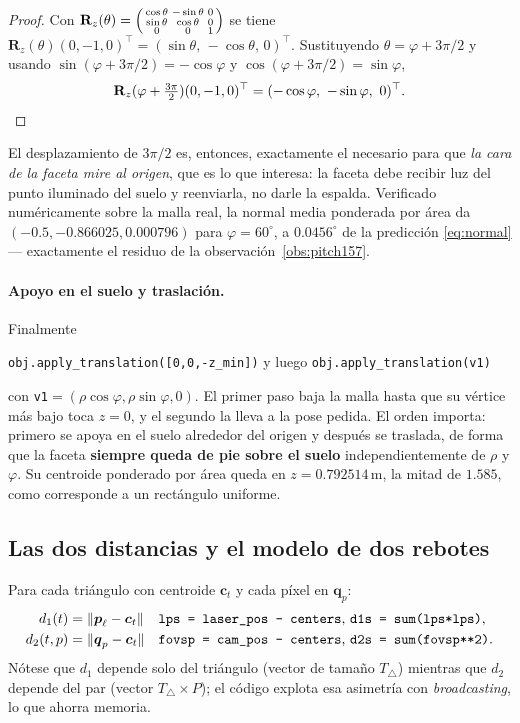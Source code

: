 \documentclass[11pt,a4paper]{article}
\newcommand{\vect}[1]{\boldsymbol{#1}}
\newcommand{\matr}[1]{\mathbf{#1}}
\newcommand{\code}[1]{\texttt{#1}}
\theoremstyle{definition}
\theoremstyle{plain}
\begin{document}
\begin{proof}
Con $\matr R_z(\theta)=\begin{psmallmatrix}\cos\theta&-\sin\theta&0\\
\sin\theta&\cos\theta&0\\0&0&1\end{psmallmatrix}$ se tiene
$\matr R_z(\theta)(0,-1,0)^\top=(\sin\theta,\,-\cos\theta,\,0)^\top$.
Sustituyendo $\theta=\varphi+3\pi/2$ y usando
$\sin(\varphi+3\pi/2)=-\cos\varphi$ y $\cos(\varphi+3\pi/2)=\sin\varphi$,
%
\[
\matr R_z(\varphi+\tfrac{3\pi}{2})(0,-1,0)^\top
=(-\cos\varphi,\ -\sin\varphi,\ 0)^\top . \qedhere
\]
\end{proof}

El desplazamiento de $3\pi/2$ es, entonces, exactamente el necesario para que
\emph{la cara de la faceta mire al origen}, que es lo que interesa: la faceta
debe recibir luz del punto iluminado del suelo y reenviarla, no darle la
espalda. Verificado numéricamente sobre la malla real, la normal media ponderada
por área da $(-0.5,-0.866025,0.000796)$ para $\varphi=60^\circ$, a
$0.0456^\circ$ de la predicción \eqref{eq:normal} --- exactamente el residuo
de la observación~\ref{obs:pitch157}.

\paragraph{Apoyo en el suelo y traslación.}
Finalmente
%
\begin{center}
\code{obj.apply\_translation([0,0,-z\_min])} \quad y luego \quad
\code{obj.apply\_translation(v1)}
\end{center}
%
con \code{v1}$=(\rho\cos\varphi,\rho\sin\varphi,0)$. El primer paso baja la
malla hasta que su vértice más bajo toca $z=0$, y el segundo la lleva a la pose
pedida. El orden importa: primero se apoya en el suelo alrededor del origen y
después se traslada, de forma que la faceta \textbf{siempre queda de pie sobre
el suelo} independientemente de $\rho$ y $\varphi$. Su centroide ponderado por
área queda en $z=0.792514\,$m, la mitad de $1.585$, como corresponde a un
rectángulo uniforme.

\subsection{Las dos distancias y el modelo de dos rebotes}
\label{sec:distancias}

Para cada triángulo con centroide $\vect c_t$ y cada píxel en $\vect q_p$:
%
\begin{align}
\label{eq:d1}
d_1(t) &= \lVert \vect p_\ell - \vect c_t\rVert
        &&\text{\code{lps = laser\_pos - centers}, \code{d1s = sum(lps*lps)}},\\
\label{eq:d2}
d_2(t,p) &= \lVert \vect q_p - \vect c_t\rVert
        &&\text{\code{fovsp = cam\_pos - centers}, \code{d2s = sum(fovsp**2)}} .
\end{align}
%
Nótese que $d_1$ depende solo del triángulo (vector de tamaño $T_\triangle$)
mientras que $d_2$ depende del par (vector $T_\triangle\times P$); el código
explota esa asimetría con \emph{broadcasting}, lo que ahorra memoria.
\end{document}
